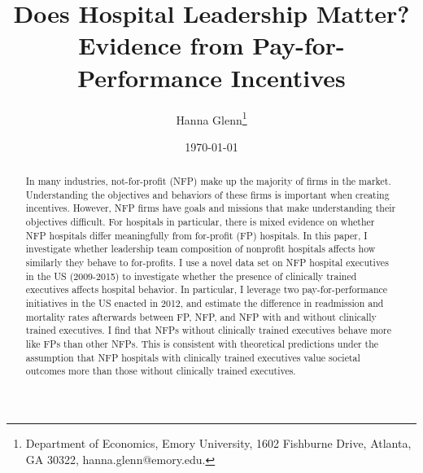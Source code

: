 \documentclass[12pt]{article}
\begin{document}
	
	
	
	
	\linespread{1.2}\title{\vspace{-0.5in} Does Hospital Leadership Matter?\\ \large Evidence from Pay-for-Performance Incentives} 
	
	\date{\today}
	
	\author{\vspace{10mm}Hanna Glenn\footnote{Department of Economics, Emory University, 1602 Fishburne Drive, Atlanta, GA 30322, hanna.glenn@emory.edu.} }
	
	\maketitle
	
	\vspace{-0.2in}
	
	\singlespacing\maketitle


 \vspace{3mm}
	
    \begin{abstract}
		{\small
        In many industries, not-for-profit (NFP) make up the majority of firms in the market. Understanding the objectives and behaviors of these firms is important when creating incentives. However, NFP firms have goals and missions that make understanding their objectives difficult. For hospitals in particular, there is mixed evidence on whether NFP hospitals differ meaningfully from for-profit (FP) hospitals. In this paper, I investigate whether leadership team composition of nonprofit hospitals affects how similarly they behave to for-profits. I use a novel data set on NFP hospital executives in the US (2009-2015) to investigate whether the presence of clinically trained executives affects hospital behavior. In particular, I leverage two pay-for-performance initiatives in the US enacted in 2012, and estimate the difference in readmission and mortality rates afterwards between FP, NFP, and NFP with and without clinically trained executives. I find that NFPs without clinically trained executives behave more like FPs than other NFPs. This is consistent with theoretical predictions under the assumption that NFP hospitals with clinically trained executives value societal outcomes more than those without clinically trained executives.
		} 
	\end{abstract}
	
\end{document}
